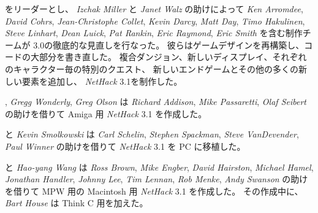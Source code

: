 \medskip
 をリーダーとし、
{\it Izchak Miller\/} と {\it Janet Walz} の助けによって
{\it Ken Arromdee},
{\it David Cohrs}, {\it Jean-Christophe Collet}, {\it Kevin Darcy},
{\it Matt Day}, {\it Timo Hakulinen}, {\it Steve Linhart}, {\it Dean Luick},
{\it Pat Rankin}, {\it Eric Raymond}, {\it Eric Smith\/} を含む制作チームが
3.0の徹底的な見直しを行なった。
彼らはゲームデザインを再構築し、コードの大部分を書き直した。
複合ダンジョン、新しいディスプレイ、それぞれのキャラクター毎の特別のクエスト、
新しいエンドゲームとその他の多くの新しい要素を追加し、
{\it NetHack\/} 3.1を制作した。

\medskip
, {\it Gregg Wonderly\/}, {\it Greg Olson} は
{\it Richard Addison}, {\it Mike Passaretti}, {\it Olaf Seibert} の助けを借りて
Amiga 用 {\it NetHack\/} 3.1 を作成した。

\medskip
 と {\it Kevin Smolkowski} は
{\it Carl Schelin}, {\it Stephen Spackman}, {\it Steve VanDevender},
{\it Paul Winner} の助けを借りて {\it NetHack\/} 3.1 を PC に移植した。

\medskip
 と {\it Hao-yang Wang} は
{\it Ross Brown}, {\it Mike Engber}, {\it David Hairston},
{\it Michael Hamel}, {\it Jonathan Handler}, {\it Johnny Lee},
{\it Tim Lennan}, {\it Rob Menke}, {\it Andy Swanson} の助けを借りて
MPW 用の Macintosh 用 {\it NetHack\/} 3.1 を作成した。
その作成中に、{\it Bart House} は Think C 用を加えた。

